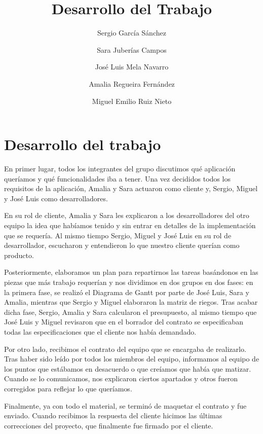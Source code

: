 \documentclass[a4paper,11pt]{report}
\begin{document}
\title{Desarrollo del Trabajo}

\author{
		Sergio García Sánchez
		\and
		Sara Juberías Campos
		\and
		José Luis Mela Navarro
		\and
		Amalia Regueira Fernández
		\and
		Miguel Emilio Ruiz Nieto
	}

\maketitle
\section*{Desarrollo del trabajo}

En primer lugar, todos los integrantes del grupo discutimos qué aplicación
queríamos y qué funcionalidades iba a tener. Una vez decididos todos los
requisitos de la aplicación, Amalia y Sara actuaron como cliente y,
Sergio, Miguel y José Luis como desarrolladores.

En su rol de cliente, Amalia y Sara les explicaron a los desarrolladores del
otro equipo la idea que habíamos tenido y sin entrar en detalles de
la implementación que se requería. Al mismo tiempo Sergio, Miguel y José Luis
en su rol de desarrollador, escucharon y entendieron lo que nuestro cliente
querían como producto.

Posteriormente, elaboramos un plan para repartirnos las tareas basándonos en las
piezas que más trabajo requerían y nos dividimos en dos grupos en dos fases: en
la primera fase, se realizó el Diagrama de Gantt por parte de José Luis, Sara
y Amalia, mientras que Sergio y Miguel elaboraron la matriz de riegos.
Tras acabar dicha fase, Sergio, Amalia y Sara calcularon el presupuesto, al
mismo tiempo que José Luis y Miguel revisaron que en  el borrador del contrato
se especificaban todas las especificaciones que el cliente nos había demandado.

Por otro lado, recibimos el contrato del equipo que se encargaba de realizarlo.
Tras haber sido leído por todos los miembros del equipo, informamos al equipo de
los puntos que estábamos en desacuerdo o que creíamos que había que matizar.
Cuando se lo comunicamos, nos explicaron ciertos apartados y otros fueron
corregidos para reflejar lo que queríamos.

Finalmente, ya con todo el material, se terminó de maquetar el contrato y fue enviado.
Cuando recibimos la respuesta del cliente hicimos las últimas correcciones del
proyecto, que finalmente fue firmado por el cliente.
\end{document}
